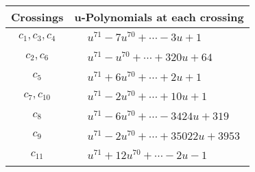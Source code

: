 \documentclass[1p]{elsarticle_modified}
\theoremstyle{definition}
\begin{document}
\begin{tabular}{m{50pt}|m{274pt}}
Crossings & \hspace{64pt}u-Polynomials at each crossing \\
\hline $$\begin{aligned}c_{1},c_{3},c_{4}\end{aligned}$$&$\begin{aligned}
&u^{71}-7 u^{70}+\cdots-3 u+1
\end{aligned}$\\
\hline $$\begin{aligned}c_{2},c_{6}\end{aligned}$$&$\begin{aligned}
&u^{71}- u^{70}+\cdots+320 u+64
\end{aligned}$\\
\hline $$\begin{aligned}c_{5}\end{aligned}$$&$\begin{aligned}
&u^{71}+6 u^{70}+\cdots+2 u+1
\end{aligned}$\\
\hline $$\begin{aligned}c_{7},c_{10}\end{aligned}$$&$\begin{aligned}
&u^{71}-2 u^{70}+\cdots+10 u+1
\end{aligned}$\\
\hline $$\begin{aligned}c_{8}\end{aligned}$$&$\begin{aligned}
&u^{71}-6 u^{70}+\cdots-3424 u+319
\end{aligned}$\\
\hline $$\begin{aligned}c_{9}\end{aligned}$$&$\begin{aligned}
&u^{71}-2 u^{70}+\cdots+35022 u+3953
\end{aligned}$\\
\hline $$\begin{aligned}c_{11}\end{aligned}$$&$\begin{aligned}
&u^{71}+12 u^{70}+\cdots-2 u-1
\end{aligned}$\\
\hline
\end{tabular}\\~\\
\newpage\renewcommand{\arraystretch}{1}
\end{document}
